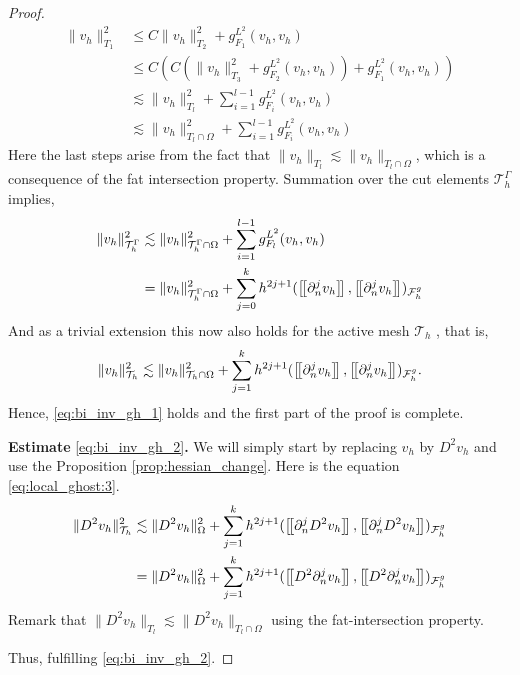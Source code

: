 \begin{proof}
    \begin{align}
            \| v_{h} \|_{ T_{1} }^{2  }  & \le  C \| v_{h} \|_{ T_{2} }^{ 2 } + g_{F_{1}}^{L^{2}}( v_{h},v_{h})\\
              & \le  C( C( \| v_{h} \|_{ T_{3} }^{ 2 } + g_{F_{2}}^{L^{2}}( v_{h},v_{h}) ) + g_{F_{1}}^{L^{2}}( v_{h},v_{h}) )\\
              & \lesssim    \| v_{h} \|_{ T_{l} }^{ 2 }  + \sum_{i=1}^{l-1} g_{F_{i}}^{L^{2}}( v_{h},v_{h})  \\
              & \lesssim    \| v_{h} \|_{ T_{l} \cap \Omega  }^{ 2 }  + \sum_{i=1}^{l-1} g_{F_{i}}^{L^{2}}( v_{h},v_{h})
    \end{align}
            Here the last steps arise from the fact that $\|  v_{h} \|_{ T_{l} }^{  } \lesssim  \|  v_{h} \|_{ T_{l} \cap \Omega  }^{  }  $, which is a consequence of the fat intersection property.
            Summation over the cut elements $\mathcal{T} ^{\Gamma }_{h}$ implies,
            \begin{align}
                    \| v_{h} \|_{ \mathcal{T} ^{\Gamma }_h }^{2  } & \lesssim \| v_{h} \|_{ \mathcal{T} ^{\Gamma }_h\cap \Omega  }^{2  }+ \sum_{i=1}^{l-1} g_{F_{l}}^{L^{2}}( v_{h},v_{h}) \\
                                                                 & = \| v_{h} \|_{ \mathcal{T}^{\Gamma }_h \cap \Omega   }^{ 2 }  + \sum_{j=0}^{k} h^{2j+1} ( \left[\!\left[  \partial ^{j}_{n} v_{h}  \right]\!\right], \left[\!\left[  \partial ^{j}_{n}v_{h}  \right]\!\right]    )_{\mathcal{F}_{h}^{g}}
            \end{align}
        And as a trivial extension this now also holds for the active mesh $\mathcal{T} _{h}$ , that is,
        \begin{equation}
                    \| v_{h} \|_{ \mathcal{T} _{h } }^{2  } \lesssim  \| v_{h} \|_{ \mathcal{T}_{h } \cap \Omega   }^{ 2 }  + \sum_{j=1}^{k} h^{2j+1} ( \left[\!\left[  \partial ^{j}_{n} v_{h}  \right]\!\right], \left[\!\left[  \partial ^{j}_{n}v_{h}  \right]\!\right]    )_{\mathcal{F}_{h}^{g}}.
        \end{equation}
        Hence, \eqref{eq:bi_inv_gh_1} holds and the first part of the proof is complete.

        \textbf{Estimate} \eqref{eq:bi_inv_gh_2}\textbf{.}  We will simply start by replacing $v_{h}$ by $D^2 v_{h}$ and use the Proposition \ref{prop:hessian_change}.
        Here is the equation \eqref{eq:local_ghost:3}.
        \begin{align}
                    \| D^2 v_{h} \|_{ \mathcal{T} _{h} }^{2  }&  \lesssim \| D^2 v_{h} \|_{ \Omega  }^{ 2 }  + \sum_{j=1}^{k} h^{2j+1} ( \jump{   \partial ^{j}_{n} D^2 v_{h} }, \jump{  \partial ^{j}_{n} D^2 v_{h}}    )_{\mathcal{F}_{h}^{g}} \\
                    &=  \| D^2 v_{h} \|_{ \Omega  }^{ 2 }  + \sum_{j=1}^{k} h^{2j+1} ( \jump{   D^2 \partial ^{j}_{n}  v_{h} }, \jump{  D^2 \partial ^{j}_{n}  v_{h}}    )_{\mathcal{F}_{h}^{g}}
        \end{align}
        Remark that $\|  D^2 v_{h} \|_{ T_{l} }^{  } \lesssim  \|  D^2 v_{h} \|_{ T_{l} \cap \Omega  }^{  }  $ using the fat-intersection property.

        Thus, fulfilling \eqref{eq:bi_inv_gh_2}.
\end{proof}



